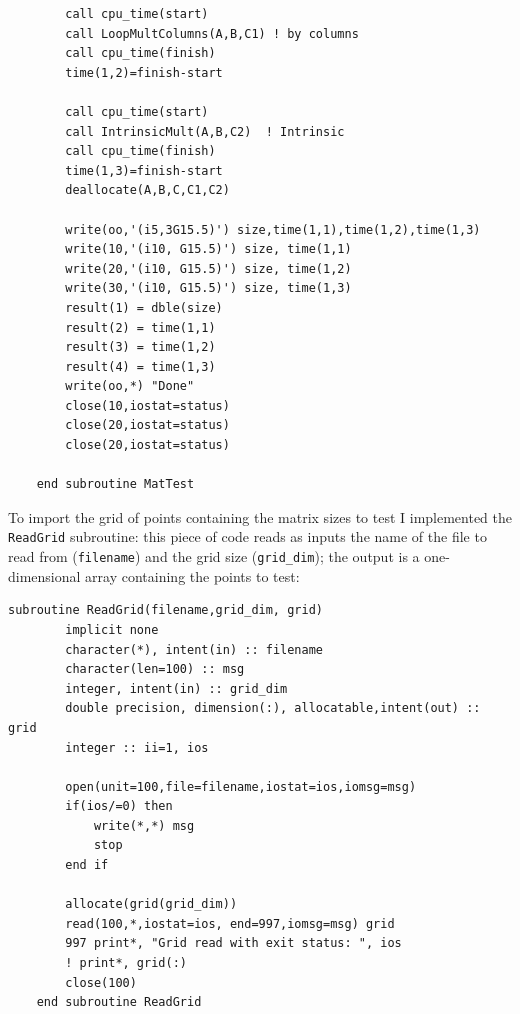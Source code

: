 \documentclass[a4paper]{article}
\begin{document}
\begin{lstlisting}
        call cpu_time(start)
        call LoopMultColumns(A,B,C1) ! by columns
        call cpu_time(finish)
        time(1,2)=finish-start

        call cpu_time(start)
        call IntrinsicMult(A,B,C2)  ! Intrinsic
        call cpu_time(finish)
        time(1,3)=finish-start
        deallocate(A,B,C,C1,C2)          
            
        write(oo,'(i5,3G15.5)') size,time(1,1),time(1,2),time(1,3)
        write(10,'(i10, G15.5)') size, time(1,1)
        write(20,'(i10, G15.5)') size, time(1,2)
        write(30,'(i10, G15.5)') size, time(1,3)
        result(1) = dble(size)
        result(2) = time(1,1)
        result(3) = time(1,2)
        result(4) = time(1,3)
        write(oo,*) "Done"
        close(10,iostat=status)
        close(20,iostat=status)
        close(20,iostat=status)

    end subroutine MatTest
\end{lstlisting}

\noindent To import the grid of points containing the matrix sizes to test I implemented the \lstinline{ReadGrid} subroutine: this piece of code reads as inputs the name of the file to read from (\lstinline{filename}) and the grid size (\lstinline{grid_dim}); the output is a one-dimensional array containing the points to test:

\begin{lstlisting}
subroutine ReadGrid(filename,grid_dim, grid)
        implicit none
        character(*), intent(in) :: filename
        character(len=100) :: msg
        integer, intent(in) :: grid_dim
        double precision, dimension(:), allocatable,intent(out) :: grid
        integer :: ii=1, ios

        open(unit=100,file=filename,iostat=ios,iomsg=msg)
        if(ios/=0) then
            write(*,*) msg
            stop
        end if

        allocate(grid(grid_dim))
        read(100,*,iostat=ios, end=997,iomsg=msg) grid 
        997 print*, "Grid read with exit status: ", ios
        ! print*, grid(:)
        close(100)
    end subroutine ReadGrid
\end{lstlisting}
\end{document}
